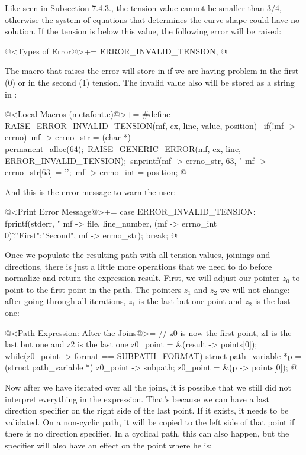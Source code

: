 {{{{{Like seen in Subsection 7.4.3., the tension value cannot be smaller
than 3/4, otherwise the system of equations that determines the curve
shape could have no solution. If the tension is below this value, the
following error will be raised:

\iniciocodigo
@<Types of Error@>+=
ERROR_INVALID_TENSION,
@
\fimcodigo

The macro that raises the error will store in 
if we are having problem in the first (0) or in the second (1) tension. The invalid value also will be stored as a string in :

\iniciocodigo
@<Local Macros (metafont.c)@>+=
#define RAISE_ERROR_INVALID_TENSION(mf, cx, line, value, position) {\
  if(!mf -> errno){\
    mf -> errno_str = (char *) permanent_alloc(64);\
    RAISE_GENERIC_ERROR(mf, cx, line, ERROR_INVALID_TENSION);\
    snprintf(mf -> errno_str, 63, "%
    mf -> errno_str[63] = '\0';\
    mf -> errno_int = position;}}
@
\fimcodigo

And this is the error message to warn the user:

\iniciocodigo
@<Print Error Message@>+=
case ERROR_INVALID_TENSION:
  fprintf(stderr,
          "%
          mf -> file, line_number, (mf -> errno_int == 0)?"First":"Second",
          mf -> errno_str);
  break;
@
\fimcodigo

Once we populate the resulting path with all tension values, joinings
and directions, there is just a little more operations that we need to
do before normalize and return the expression result. First, we will
adjust our pointer $z_0$ to point to the first point in the path. The
pointers $z_1$ and $z_2$ we will not change: after going through all
iterations, $z_1$ is the last but one point and $z_2$ is the last one:

\iniciocodigo
@<Path Expression: After the Joins@>=
// z0 is now the first point, z1 is the last but one and z2 is the last one
z0_point = &(result -> points[0]);
while(z0_point -> format == SUBPATH_FORMAT){
  struct path_variable *p = (struct path_variable *) z0_point -> subpath;
  z0_point = &(p -> points[0]);
}
@
\fimcodigo

Now after we have iterated over all the joins, it is possible that we
still did not interpret everything in the expression. That's because
we can have a last direction specifier on the right side of the last
point. If it exists, it needs to be validated. On a non-cyclic path,
it will be copied to the left side of that point if there is no
direction specifier. In a cyclical path, this can also happen, but the
specifier will also have an effect on the point where he is:

}}}}}
